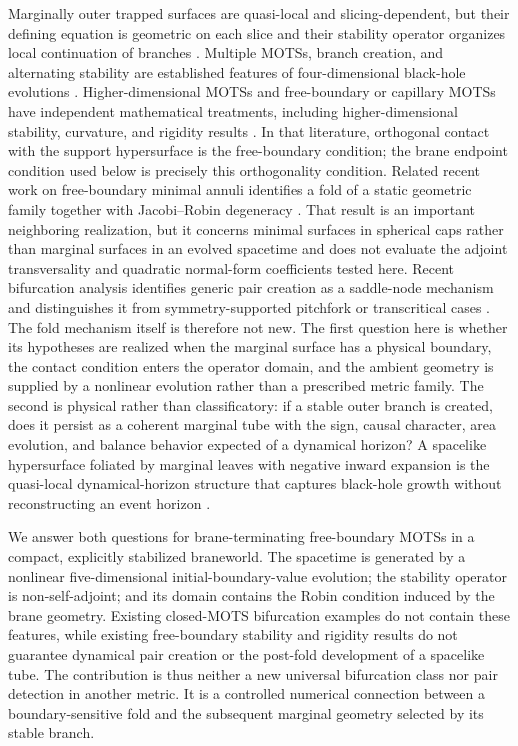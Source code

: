 \documentclass[11pt]{article}
\begin{document}
Marginally outer trapped surfaces are quasi-local and slicing-dependent, but
their defining equation is geometric on each slice and their stability
operator organizes local continuation of branches
\cite{Thornburg2007,AnderssonMarsSimon2005,AnderssonMarsSimon2008,AnderssonMarsMetzgerSimon2009}.
Multiple MOTSs, branch creation,
and alternating stability are established features of four-dimensional
black-hole evolutions
\cite{PookKolbEtAl2019,PookKolbEtAl2019Interior,BoothHennigarPookKolb2021,PookKolbBoothHennigar2021}.
Higher-dimensional MOTSs and free-boundary or capillary MOTSs have independent
mathematical treatments, including higher-dimensional stability, curvature,
and rigidity results
\cite{PaetzSimon2013,AlaeeLesourdYau2020,Chai2024,Mendes2021,Lee2025,deAlmeidaMendes2026}.
In that literature, orthogonal contact with the support hypersurface is the
free-boundary condition; the brane endpoint condition used below is precisely
this orthogonality condition.
Related recent work on free-boundary minimal annuli identifies a fold of a
static geometric family together with Jacobi--Robin degeneracy
\cite{Pigazzini2026}.  That result is an important neighboring realization,
but it concerns minimal surfaces in spherical caps rather than marginal
surfaces in an evolved spacetime and does not evaluate the adjoint
transversality and quadratic normal-form coefficients tested here.
Recent bifurcation analysis identifies generic pair creation as a saddle-node
mechanism and distinguishes it from symmetry-supported pitchfork or
transcritical cases \cite{BoothCoxOkpala2026,BoothCoxMargalefBentabol2024}.
The fold mechanism itself is therefore not new.  The first question here is
whether its hypotheses are realized when the marginal surface has a physical
boundary, the contact condition enters the operator domain, and the ambient
geometry is supplied by a nonlinear evolution rather than a prescribed metric
family.  The second is physical rather than classificatory: if a stable outer
branch is created, does it persist as a coherent marginal tube with the sign,
causal character, area evolution, and balance behavior expected of a
dynamical horizon?  A spacelike hypersurface foliated by marginal leaves with
negative inward expansion is the quasi-local dynamical-horizon structure that
captures black-hole growth without reconstructing an event horizon
\cite{AshtekarKrishnan2002,AshtekarKrishnan2003}.

We answer both questions for brane-terminating free-boundary MOTSs in a
compact, explicitly stabilized braneworld.  The spacetime is generated by a
nonlinear five-dimensional initial-boundary-value evolution; the stability
operator is non-self-adjoint; and its domain contains the Robin condition
induced by the brane geometry.  Existing closed-MOTS bifurcation examples do
not contain these features, while existing free-boundary stability and
rigidity results do not guarantee dynamical pair creation or the post-fold
development of a spacelike tube.  The contribution is thus neither a new
universal bifurcation class nor pair detection in another metric.  It is a
controlled numerical connection between a boundary-sensitive fold and the
subsequent marginal geometry selected by its stable branch.
\end{document}
